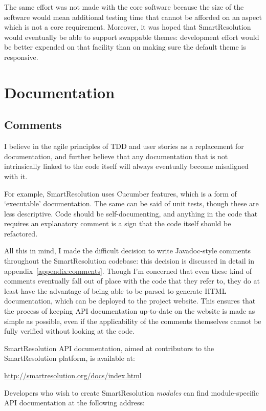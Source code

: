 The same effort was not made with the core software because the size of the software would mean additional testing time that cannot be afforded on an aspect which is not a core requirement. Moreover, it was hoped that SmartResolution would eventually be able to support swappable themes: development effort would be better expended on that facility than on making sure the default theme is responsive.

\section{Documentation}

\subsection{Comments}

I believe in the agile principles of TDD and user stories as a replacement for documentation, and further believe that any documentation that is not intrinsically linked to the code itself will always eventually become misaligned with it.

For example, SmartResolution uses Cucumber features, which is a form of `executable' documentation. The same can be said of unit tests, though these are less descriptive. Code should be self-documenting, and anything in the code that requires an explanatory comment is a sign that the code itself should be refactored.

All this in mind, I made the difficult decision to write Javadoc-style comments throughout the SmartResolution codebase: this decision is discussed in detail in appendix~\ref{appendix:comments}. Though I'm concerned that even these kind of comments eventually fall out of place with the code that they refer to, they do at least have the advantage of being able to be parsed to generate HTML documentation, which can be deployed to the project website. This ensures that the process of keeping API documentation up-to-date on the website is made as simple as possible, even if the applicability of the comments themselves cannot be fully verified without looking at the code.

SmartResolution API documentation, aimed at contributors to the SmartResolution platform, is available at:

\url{http://smartresolution.org/docs/index.html}

Developers who wish to create SmartResolution \emph{modules} can find module-specific API documentation at the following address:

